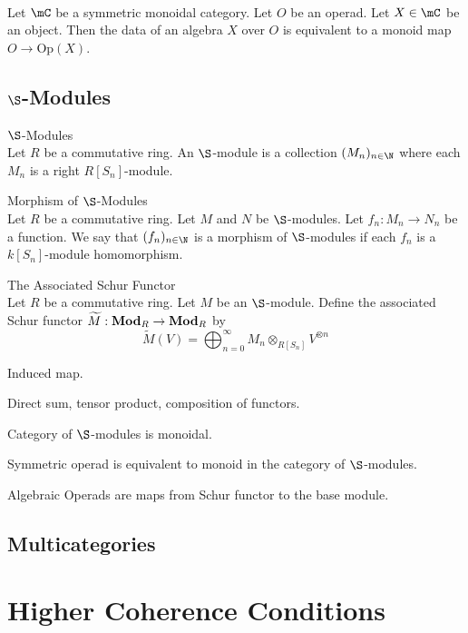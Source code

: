 \documentclass[a4paper]{article}
\begin{document}
\begin{prp}{}{}\\
Let $\mC$ be a symmetric monoidal category. Let $O$ be an operad. Let $X\in\mC$ be an object. Then the data of an algebra $X$ over $O$ is equivalent to a monoid map $O\to\text{Op}(X)$. 
\end{prp}

\subsection{$\S$-Modules}
\begin{defn}{$\S$-Modules}{}\\
Let $R$ be a commutative ring. An $\S$-module is a collection $(M_n)_{n\in\N}$ where each $M_n$ is a right $R[S_n]$-module. 
\end{defn}

\begin{defn}{Morphism of $\S$-Modules}{}\\
Let $R$ be a commutative ring. Let $M$ and $N$ be $\S$-modules. Let $f_n:M_n\to N_n$ be a function. We say that $(f_n)_{n\in\N}$ is a morphism of $\S$-modules if each $f_n$ is a $k[S_n]$-module homomorphism. 
\end{defn}

\begin{defn}{The Associated Schur Functor}{}\\
Let $R$ be a commutative ring. Let $M$ be an $\S$-module. Define the associated Schur functor $\widetilde{M}:\bold{Mod}_R\to\bold{Mod}_R$ by $$\widetilde{M}(V)=\bigoplus_{n=0}^\infty M_n\otimes_{R[S_n]} V^{\otimes n}$$
\end{defn}

Induced map. 

Direct sum, tensor product, composition of functors. 

Category of $\S$-modules is monoidal. 

Symmetric operad is equivalent to monoid in the category of $\S$-modules. 

Algebraic Operads are maps from Schur functor to the base module. 

\subsection{Multicategories}

\pagebreak
\section{Higher Coherence Conditions}
\end{document}
